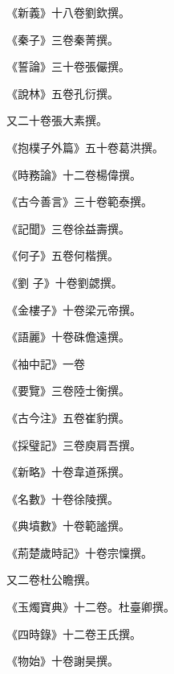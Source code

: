 \begin{pinyinscope}
 《新義》十八卷劉欽撰。



 《秦子》三卷秦菁撰。



 《誓論》三十卷張儼撰。



 《說林》五卷孔衍撰。



 又二十卷張大素撰。



 《抱樸子外篇》五十卷葛洪撰。



 《時務論》十二卷楊偉撰。



 《古今善言》三十卷範泰撰。



 《記聞》三卷徐益壽撰。



 《何子》五卷何楷撰。



 《劉
 子》十卷劉勰撰。



 《金樓子》十卷梁元帝撰。



 《語麗》十卷硃儋遠撰。



 《袖中記》一卷



 《要覽》三卷陸士衡撰。



 《古今注》五卷崔豹撰。



 《採璧記》三卷庾肩吾撰。



 《新略》十卷韋道孫撰。



 《名數》十卷徐陵撰。



 《典墳數》十卷範謐撰。



 《荊楚歲時記》十卷宗懍撰。



 又二卷杜公瞻撰。



 《玉燭寶典》十二卷。杜臺卿撰。



 《四時錄》十二卷王氏撰。



 《物始》十卷謝昊撰。




\end{pinyinscope}
